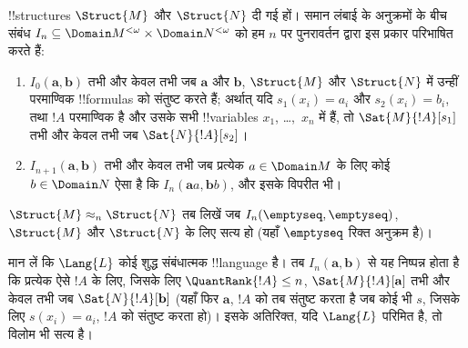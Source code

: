 \documentclass[../../../include/open-logic-section]{subfiles}
\begin{document}
\begin{defn}
  !!{structure}s $\Struct{M}$ और $\Struct{N}$ दी गई हों। समान लंबाई के
  अनुक्रमों के बीच संबंध $I_n \subseteq \Domain M^{<\omega} \times \Domain N^{<\omega}$
  को हम $n$ पर पुनरावर्तन द्वारा इस प्रकार परिभाषित
  करते हैं:
   \begin{enumerate}
   \item $I_0(\mathbf{a},\mathbf{b})$ तभी और केवल तभी जब $\mathbf{a}$ और
     $\mathbf{b}$, $\Struct{M}$ और $\Struct{N}$ में उन्हीं परमाण्विक
     !!{formula}s को संतुष्ट करते हैं; अर्थात् यदि $s_1(x_i) = a_i$ और
     $s_2(x_i) =
     b_i$, तथा $!A$ परमाण्विक है और उसके सभी !!{variable}s
     $x_1$, \dots,~$x_n$ में हैं, तो $\Sat{M}{!A}[s_1]$ तभी और केवल तभी जब
     $\Sat{N}{!A}[s_2]$।
   \item $I_{n+1} (\mathbf{a},\mathbf{b})$ तभी और केवल तभी जब प्रत्येक
     $a\in \Domain M$ के लिए कोई $b\in \Domain N$ ऐसा है कि $I_n
     (\mathbf{a}a,\mathbf{b}b)$, और इसके विपरीत भी।
   \end{enumerate}
\end{defn}


\begin{defn}
  $\Struct{M} \approx_n \Struct{N}$ तब लिखें जब
  $I_n(\emptyseq,\emptyseq)$, $\Struct{M}$ और $\Struct{N}$ के लिए सत्य हो
  (यहाँ $\emptyseq$ रिक्त अनुक्रम है)।
\end{defn}

\begin{thm}
  मान लें कि $\Lang{L}$ कोई शुद्ध संबंधात्मक !!{language} है। तब $I_n
  (\mathbf{a},\mathbf{b})$ से यह निष्पन्न होता है कि प्रत्येक ऐसे $!A$ के
  लिए, जिसके लिए $\QuantRank{!A} \le n$, $\Sat{M}{!A}[\mathbf{a}]$ तभी और
  केवल तभी जब $\Sat{N}{!A}[\mathbf{b}]$ (यहाँ फिर $\mathbf{a}$, $!A$ को तब
  संतुष्ट करता है जब कोई भी $s$, जिसके लिए $s(x_i) = a_i$, $!A$ को संतुष्ट करता
  हो)। इसके अतिरिक्त, यदि $\Lang{L}$ परिमित है, तो विलोम भी सत्य है।
\end{thm}
\end{document}
